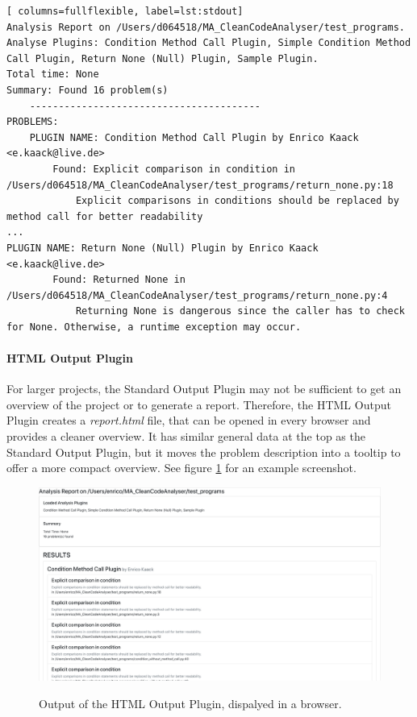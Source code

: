\begin{minipage}[c]{\linewidth}
\begin{lstlisting}[ columns=fullflexible, label=lst:stdout]
Analysis Report on /Users/d064518/MA_CleanCodeAnalyser/test_programs.
Analyse Plugins: Condition Method Call Plugin, Simple Condition Method Call Plugin, Return None (Null) Plugin, Sample Plugin.
Total time: None
Summary: Found 16 problem(s)
    ----------------------------------------
PROBLEMS:
    PLUGIN NAME: Condition Method Call Plugin by Enrico Kaack <e.kaack@live.de>
        Found: Explicit comparison in condition in /Users/d064518/MA_CleanCodeAnalyser/test_programs/return_none.py:18
            Explicit comparisons in conditions should be replaced by method call for better readability
...
PLUGIN NAME: Return None (Null) Plugin by Enrico Kaack <e.kaack@live.de>
        Found: Returned None in /Users/d064518/MA_CleanCodeAnalyser/test_programs/return_none.py:4
            Returning None is dangerous since the caller has to check for None. Otherwise, a runtime exception may occur.
\end{lstlisting} 
\end{minipage}

\paragraph{HTML Output Plugin}
For larger projects, the Standard Output Plugin may not be sufficient to get an overview of the project or to generate a report. Therefore, the HTML Output Plugin creates a \textit{report.html} file, that can be opened in every browser and provides a cleaner overview. It has similar general data at the top as the Standard Output Plugin, but it moves the problem description into a tooltip to offer a more compact overview. See figure \ref{fig:screen_html_output} for an example screenshot.

\begin{figure}
    \includegraphics[width=1\textwidth]{img/CCAP/screenshot_html_output.png}
    \label{fig:screen_html_output}
    \caption{Output of the HTML Output Plugin, dispalyed in a browser.}
\end{figure}

